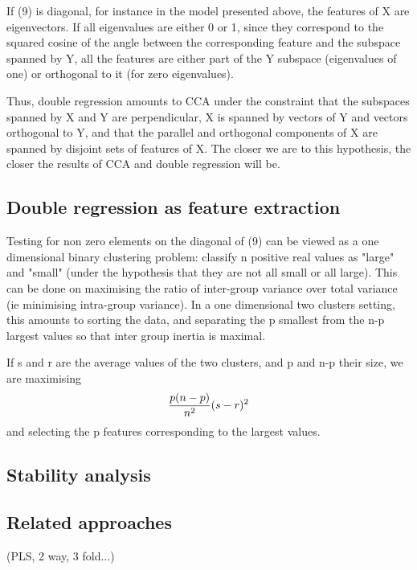 \documentclass{article}
\begin{document}
If (9) is diagonal, for instance in the model presented above, the features of X are eigenvectors. If all eigenvalues are either 0 or 1, since they correspond to the squared cosine of the angle between the corresponding feature and the subspace spanned by Y, all the features are either part of the Y subspace (eigenvalues of one) or orthogonal to it (for zero eigenvalues). 

Thus, double regression amounts to CCA under the constraint that the subspaces spanned by X and Y are perpendicular, X is spanned by vectors of Y and vectors orthogonal to Y, and that the parallel and orthogonal components of X are spanned by disjoint sets of features of X. The closer we are to this hypothesis, the closer the results of CCA and double regression will be.

\subsection{Double regression as feature extraction}

Testing for non zero elements on the diagonal of (9) can be viewed as a one dimensional binary clustering problem: classify n positive real values as "large" and "small" (under the hypothesis that they are not all small or all large). This can be done on maximising the ratio of inter-group variance over total variance (ie minimising intra-group variance). In a one dimensional two clusters setting, this amounts to sorting the data, and separating the p smallest from the n-p largest values so that inter group inertia is maximal. 

If s and r are the average values of the two clusters, and p and n-p their size, we are maximising 
\begin{equation}
\begin{aligned}
{p (n-p)\over n^2} (s-r)^2 
\end{aligned}
\end{equation}
 and selecting the p features corresponding to the largest values.

\subsection{Stability analysis}

\subsection{Related approaches}
(PLS, 2 way, 3 fold...)
\end{document}
